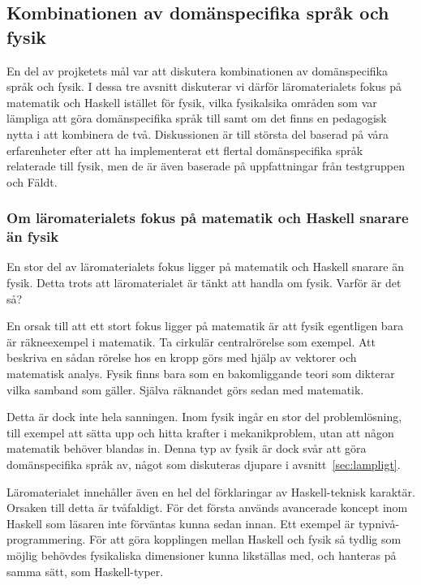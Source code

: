 \begin{draft}

\subsection{Kombinationen av domänspecifika språk och fysik}

En del av projketets mål var att diskutera kombinationen av
domänspecifika språk och fysik. I dessa tre avsnitt diskuterar vi därför
läromaterialets fokus på matematik och Haskell istället för fysik, vilka
fysikalsika områden som var lämpliga att göra domänspecifika språk till samt om
det finns en pedagogisk nytta i att kombinera de två. Diskussionen är till
största del baserad på våra erfarenheter efter att ha implementerat ett flertal
domänspecifika språk relaterade till fysik, men de är även baserade på
uppfattningar från testgruppen och Fäldt.

\subsubsection{Om läromaterialets fokus på matematik och Haskell snarare än
fysik}
En stor del av läromaterialets fokus ligger på matematik och Haskell snarare än
fysik. Detta trots att läromaterialet är tänkt att handla om fysik. Varför är
det så?

En orsak till att ett stort fokus ligger på matematik är att fysik egentligen
bara är räkneexempel i matematik. Ta cirkulär centralrörelse som exempel. Att
beskriva en sådan rörelse hos en kropp görs med hjälp av vektorer och matematisk
analys. Fysik finns bara som en bakomliggande teori som dikterar vilka samband
som gäller. Själva räknandet görs sedan med matematik.

Detta är dock inte hela sanningen. Inom fysik ingår en stor del problemlösning,
till exempel att sätta upp och hitta krafter i mekanikproblem, utan att någon
matematik behöver blandas in. Denna typ av fysik är dock svår att göra
domänspecifika språk av, något som diskuteras djupare i
avsnitt~\ref{sec:lampligt}.

Läromaterialet innehåller även en hel del förklaringar av Haskell-teknisk
karaktär. Orsaken till detta är tvåfaldigt. För det första används avancerade
koncept inom Haskell som läsaren inte förväntas kunna sedan innan. Ett exempel
är typnivå-programmering. För att göra kopplingen mellan Haskell och fysik så
tydlig som möjlig behövdes fysikaliska dimensioner kunna likställas med, och
hanteras på samma sätt, som Haskell-typer.


\end{draft}
